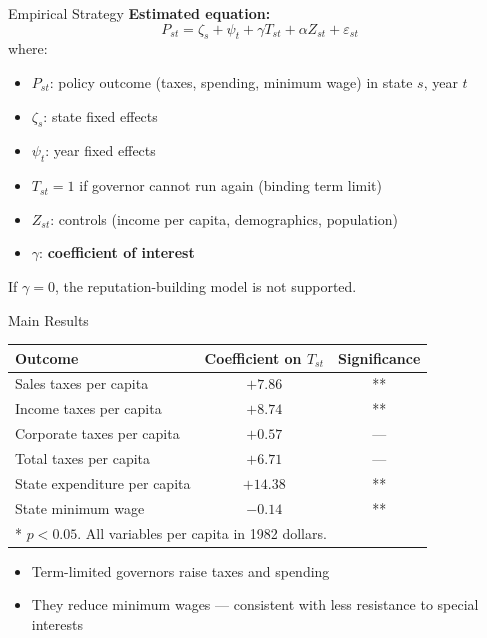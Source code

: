 \documentclass{beamer}
\begin{document}
\begin{frame}{Empirical Strategy}
\textbf{Estimated equation:}
\begin{equation*}
    P_{st} = \zeta_s + \psi_t + \gamma T_{st} + \alpha Z_{st} + \varepsilon_{st}
\end{equation*}
where:
\begin{itemize}
    \item $P_{st}$: policy outcome (taxes, spending, minimum wage) in state $s$, year $t$
    \item $\zeta_s$: state fixed effects
    \item $\psi_t$: year fixed effects
    \item $T_{st} = 1$ if governor cannot run again (binding term limit)
    \item $Z_{st}$: controls (income per capita, demographics, population)
    \item $\gamma$: \textbf{coefficient of interest}
\end{itemize}
\vspace{0.3em}
\begin{alertblock}{}
If $\gamma = 0$, the reputation-building model is not supported.
\end{alertblock}
\end{frame}

\begin{frame}{Main Results}
\begin{table}
\centering
\small
\begin{tabular}{lcc}
\toprule
\textbf{Outcome} & \textbf{Coefficient on $T_{st}$} & \textbf{Significance} \\
\midrule
Sales taxes per capita      & $+7.86$  & ** \\
Income taxes per capita     & $+8.74$  & ** \\
Corporate taxes per capita  & $+0.57$  & --- \\
Total taxes per capita      & $+6.71$  & --- \\
State expenditure per capita & $+14.38$ & ** \\
State minimum wage          & $-0.14$  & ** \\
\bottomrule
\multicolumn{3}{l}{\footnotesize ** $p < 0.05$. All variables per capita in 1982 dollars.}
\end{tabular}
\end{table}
\vspace{0.5em}
\begin{itemize}
    \item Term-limited governors raise taxes and spending
    \item They reduce minimum wages --- consistent with less resistance to special interests
\end{itemize}
\end{frame}
\end{document}
